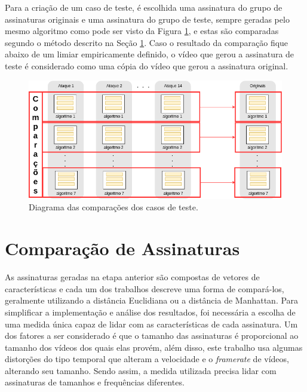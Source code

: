 Para a criação de um caso de teste, é escolhida uma assinatura do grupo de assinaturas originais e uma assinatura do grupo de teste, sempre geradas pelo mesmo algoritmo como pode ser visto da Figura \ref{fig:comparacao}, e estas são comparadas segundo o método descrito na Seção \ref{sec:met-comparacao}. Caso o resultado da comparação fique abaixo de um limiar empiricamente definido, o vídeo que gerou a assinatura de teste é considerado como uma cópia do vídeo que gerou a assinatura original.

\begin{figure}
    \centering
    \caption{Diagrama das comparações dos casos de teste.}
    \label{fig:comparacao}
    \includegraphics[width=1.0\textwidth]{dados/figuras/Comparador-1}
\end{figure}




\section{Comparação de Assinaturas}
\label{sec:met-comparacao}

As assinaturas geradas na etapa anterior são compostas de vetores de características e cada um dos trabalhos descreve uma forma de compará-los, geralmente utilizando a distância Euclidiana ou a distância de Manhattan. Para simplificar a implementação e análise dos resultados, foi necessária a escolha de uma medida única capaz de lidar com as características de cada assinatura. Um dos fatores a ser considerado é que o tamanho das assinaturas é proporcional ao tamanho dos vídeos dos quais elas provém, além disso, este trabalho usa algumas distorções do tipo temporal que alteram a velocidade e o \textit{framerate} de vídeos, alterando seu tamanho. Sendo assim, a medida utilizada precisa lidar com assinaturas de tamanhos e frequências diferentes.

